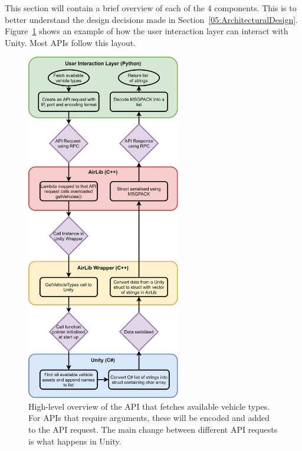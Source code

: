 This section will contain a brief overview of each of the 4 components. This is to better understand the design decisions made in Section~\ref{05:ArchitecturalDesign}. Figure~\ref{05:stringList} shows an example of how the user interaction layer can interact with Unity. Most APIs follow this layout.



\begin{figure}[p]
    \centering
    \includegraphics[width=0.6\textwidth]{05_AnalysisAndDesign/Diagrams/stringArray.png}
    \caption[Overview of an API call]{High-level overview of the API that fetches available vehicle types. For APIs that require arguments, these will be encoded and added to the API request. The main change between different API requests is what happens in Unity.} \label{05:stringList}
\end{figure}

